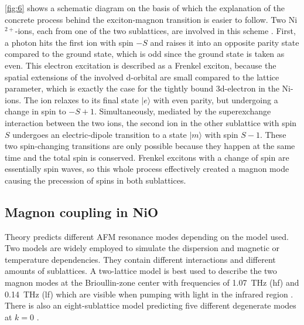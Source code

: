 \FloatBarrier
\autoref{fig:6} shows a schematic diagram on the basis of which the explanation of the concrete process behind the exciton-magnon transition is easier to follow.
Two Ni$^{2+}$-ions, each from one of the two sublattices, are involved in this scheme .
First, a photon hits the first ion with spin $-S$ and raises it into an opposite parity state compared to the ground state, which is odd since the ground state is taken as even.
This electron excitation is described as a Frenkel exciton, because the spatial extensions of the involved d-orbital are small compared to the lattice parameter, which is exactly the case for the tightly bound 3d-electron in the Ni-ions.
The ion relaxes to its final state $|e\rangle$ with even parity, but undergoing a change in spin to $-S+1$.
Simultaneously, mediated by the superexchange interaction between the two ions, the second ion in the other sublattice with spin $S$ undergoes an electric-dipole transition to a state $|m\rangle$ with spin $S-1$.
These two spin-changing transitions are only possible because they happen at the same time and the total spin is conserved.
Frenkel excitons with a change of spin are essentially spin waves, so this whole process effectively created a magnon mode causing the precession of spins in both sublattices.

\subsection{Magnon coupling in NiO}
\label{sec:mode_coupling}
Theory predicts different AFM resonance modes depending on the model used.
Two models are widely employed to simulate the dispersion and magnetic or temperature dependencies.
They contain different interactions and different amounts of sublattices.
A two-lattice model is best used to describe the two magnon modes at the Brioullin-zone center with frequencies of \qty{1.07}{THz} (hf) and \qty{0.14}{THz} (lf)  which are visible when pumping with light in the infrared region .
There is also an eight-sublattice model predicting five different degenerate modes at $k=0$ .


